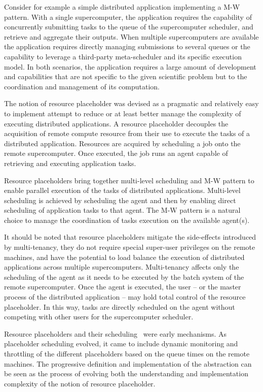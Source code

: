 \documentclass{sig-alternate}
\begin{document}
Consider for example a simple distributed application implementing a M-W
pattern. With a single supercomputer, the application requires the capability
of concurrently submitting tasks to the queue of the supercomputer scheduler,
and retrieve and aggregate their outputs. When multiple supercomputers are
available the application requires directly managing submissions to several
queues or the capability to leverage a third-party meta-scheduler and its
specific execution model. In both scenarios, the application requires a large
amount of development and capabilities that are not specific to the given
scientific problem but to the coordination and management of its computation.

The notion of resource placeholder was devised as a pragmatic and relatively
easy to implement attempt to reduce or at least better manage the complexity of
executing distributed applications. A resource placeholder decouples the
acquisition of remote compute resource from their use to execute the tasks of a
distributed application. Resources are acquired by scheduling a job onto the
remote supercomputer. Once executed, the job runs an agent capable of
retrieving and executing application tasks.

Resource placeholders bring together multi-level scheduling and M-W pattern to
enable parallel execution of the tasks of distributed applications. Multi-level
scheduling is achieved by scheduling the agent and then by enabling direct
scheduling of application tasks to that agent. The M-W pattern is a natural
choice to manage the coordination of tasks execution on the available
agent(s).

It should be noted that resource placeholders mitigate the side-effects
introduced by multi-tenancy, they do not require special super-user privileges
on the remote machines, and have the potential to load balance the execution of
distributed applications across multiple supercomputers. Multi-tenancy affects
only the scheduling of the agent as it needs to be executed by the batch system
of the remote supercomputer. Once the agent is executed, the user -- or the
master process of the distributed application -- may hold total control of the
resource placeholder. In this way, tasks are directly scheduled on the agent
without competing with other users for the supercomputer scheduler.

Resource placeholders and their
scheduling~\cite{Pinchak02practicalheterogeneous} were early \pilot mechanisms.
As placeholder scheduling evolved, it came to include dynamic monitoring and
throttling of the different placeholders based on the queue times on the remote
machines. The progressive definition and implementation of the \pilot
abstraction can be seen as the process of evolving both the understanding and
implementation complexity of the notion of resource placeholder.
\end{document}
